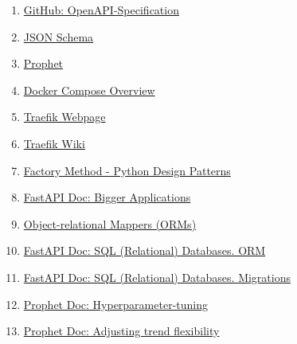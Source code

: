 \documentclass[a4paper, oneside, 12pt]{book}
\begin{document}
\begin{enumerate}
		\item
		\label{bib: openapi}
		\href{https://github.com/OAI/OpenAPI-Specification}{GitHub: OpenAPI-Specification}
		
		\item
		\label{bib: json schema}
		\href{https://json-schema.org/}{JSON Schema}
		
		\item
		\label{bib: prophet doc}
		\href{https://facebook.github.io/prophet/}{Prophet}
		
		\item
		\label{bib: docker compose doc}
		\href{https://docs.docker.com/compose/}{Docker Compose Overview}
		
		\item
		\label{bib: traefik webpage}
		\href{https://traefik.io/traefik/}{Traefik Webpage}
		
		\item
		\label{bib: traefik wiki}
		\href{https://doc.traefik.io/traefik/}{Traefik Wiki}
		
		\item
		\label{bib: factory method}
		\href{https://www.geeksforgeeks.org/factory-method-python-design-patterns/}{Factory Method - Python Design Patterns}
		
		\item
		\label{bib: fastapi doc bigger apps}
		\href{https://fastapi.tiangolo.com/tutorial/bigger-applications/}{FastAPI Doc: Bigger Applications}
		
		\item
		\label{bib: orm python}
		\href{https://www.fullstackpython.com/object-relational-mappers-orms.html}{Object-relational Mappers (ORMs)}
		
		\item
		\label{bib: fastapi orm}
		\href{https://fastapi.tiangolo.com/tutorial/sql-databases/#orms}{FastAPI Doc: SQL (Relational) Databases. ORM}
		
		\item
		\label{bib: fastapi migrations}
		\href{https://fastapi.tiangolo.com/tutorial/sql-databases/#migrations}{FastAPI Doc: SQL (Relational) Databases. Migrations}
		
		\item
		\label{bib: prophet parameters}
		\href{https://facebook.github.io/prophet/docs/diagnostics.html#hyperparameter-tuning}{Prophet Doc: Hyperparameter-tuning}
		
		\item
		\label{bib: prophet trend flex}
		\href{https://facebook.github.io/prophet/docs/trend_changepoints.html#adjusting-trend-flexibility}{Prophet Doc: Adjusting trend flexibility}
		
	\end{enumerate}
\end{document}
